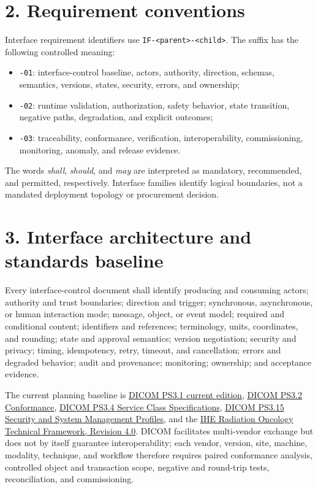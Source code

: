 \documentclass[11pt,letterpaper]{article}
\begin{document}
\section{2. Requirement conventions}
Interface requirement identifiers use \texttt{IF-<parent>-<child>}. The suffix has the following controlled meaning:
\begin{itemize}
\item \texttt{-01}: interface-control baseline, actors, authority, direction, schemas, semantics, versions, states, security, errors, and ownership;
\item \texttt{-02}: runtime validation, authorization, safety behavior, state transition, negative paths, degradation, and explicit outcomes;
\item \texttt{-03}: traceability, conformance, verification, interoperability, commissioning, monitoring, anomaly, and release evidence.
\end{itemize}
The words \textit{shall}, \textit{should}, and \textit{may} are interpreted as mandatory, recommended, and permitted, respectively. Interface families identify logical boundaries, not a mandated deployment topology or procurement decision.

\section{3. Interface architecture and standards baseline}
Every interface-control document shall identify producing and consuming actors; authority and trust boundaries; direction and trigger; synchronous, asynchronous, or human interaction mode; message, object, or event model; required and conditional content; identifiers and references; terminology, units, coordinates, and rounding; state and approval semantics; version negotiation; security and privacy; timing, idempotency, retry, timeout, and cancellation; errors and degraded behavior; audit and provenance; monitoring; ownership; and acceptance evidence.

The current planning baseline is \href{https://dicom.nema.org/medical/dicom/current/output/chtml/part01/sect_1.2.html}{DICOM PS3.1 current edition}, \href{https://dicom.nema.org/medical/dicom/current/output/html/part02.html}{DICOM PS3.2 Conformance}, \href{https://dicom.nema.org/medical/dicom/current/output/chtml/part04/sect_6.7.html}{DICOM PS3.4 Service Class Specifications}, \href{https://dicom.nema.org/medical/dicom/current/output/html/part15.html}{DICOM PS3.15 Security and System Management Profiles}, and the \href{https://profiles.ihe.net/RO/index.html}{IHE Radiation Oncology Technical Framework, Revision 4.0}. DICOM facilitates multi-vendor exchange but does not by itself guarantee interoperability; each vendor, version, site, machine, modality, technique, and workflow therefore requires paired conformance analysis, controlled object and transaction scope, negative and round-trip tests, reconciliation, and commissioning.
\end{document}
